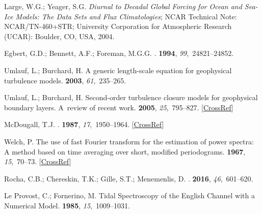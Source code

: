 \documentclass[jmse,article,accept,moreauthors,pdftex]{Definitions/mdpi}
\begin{document}
\begin{thebibliography}{999}
Large, W.G.; Yeager, S.G.
\newblock \emph{Diurnal to Decadal Global Forcing for Ocean and Sea-Ice Models: The
Data Sets and Flux Climatologies};
\newblock NCAR Technical Note: NCAR/TN-460+STR; University Corporation for Atmospheric Research (UCAR): Boulder, CO, USA, {2004}. %

Egbert, G.D.; Bennett, A.F.; Foreman, M.G.G.
.
 {\bf 1994}, {\em
99},~24821--24852.

Umlauf, L.; Burchard, H.
\newblock A generic length-scale equation for geophysical turbulence models.
 {\bf 2003}, {\em 61},~235--265.

Umlauf, L.; Burchard, H.
\newblock Second-order turbulence closure models for geophysical boundary
layers. A~review of recent work.
 {\bf 2005}, {\em 25},~795--827.
 [\href{http://dx.doi.org/10.1016/j.csr.2004.08.004}{CrossRef}]

{McDougall, T.J.
.
 {\bf 1987}, {\em
17},~1950--1964.} [\href{http://dx.doi.org/10.1175/1520-0485(1987)017<1950:NS>2.0.CO;2}{CrossRef}]

{Welch}, P.
\newblock The use of fast Fourier transform for the estimation of power
spectra: A method based on time averaging over short, modified periodograms.
 {\bf 1967},
{\em 15},~70--73. [\href{http://dx.doi.org/10.1109/TAU.1967.1161901}{CrossRef}]

Rocha, C.B.; Chereskin, T.K.; Gille, S.T.; Menemenlis, D.
.
 {\bf 2016}, {\em
46},~601--620.

{Le Provost}, C.; Fornerino, M.
\newblock Tidal Spectroscopy of the English Channel with a Numerical Model.
 {\bf 1985}, {\em
15},~1009--1031.


\end{thebibliography}
\end{document}
